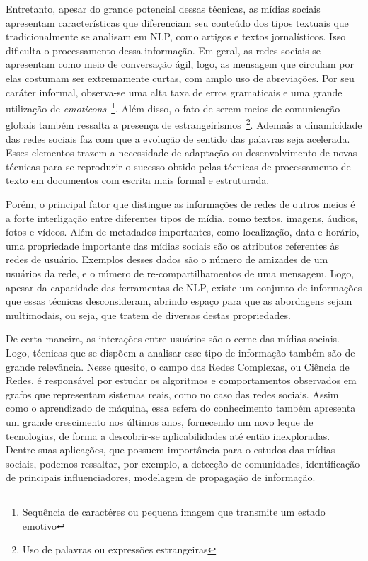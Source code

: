 Entretanto, apesar do grande potencial dessas técnicas, as mídias sociais
apresentam características que diferenciam seu conteúdo dos tipos textuais que
tradicionalmente se analisam em NLP, como artigos e textos jornalísticos.
Isso dificulta o processamento dessa informação.
Em geral, as redes sociais se apresentam como meio de conversação ágil, logo,
as mensagem que circulam por elas costumam ser extremamente curtas, com amplo
uso de abreviações.
Por seu caráter informal, observa-se uma alta taxa de erros gramaticais e
uma grande utilização de \textit{emoticons}~\footnote{Sequência de caractéres ou
pequena imagem que transmite um estado emotivo}.
Além disso, o fato de serem meios de comunicação globais também ressalta a presença
de estrangeirismos~\footnote{Uso de palavras ou expressões estrangeiras}.
Ademais a dinamicidade das redes sociais faz com que a evolução de sentido das
palavras seja acelerada.
Esses elementos trazem a necessidade de adaptação ou desenvolvimento de novas
técnicas para se reproduzir o sucesso obtido pelas técnicas de processamento de
texto em documentos com escrita mais formal e estruturada.

Porém, o principal fator que distingue as informações de redes de outros meios é
a forte interligação entre diferentes tipos de mídia, como textos, imagens,
áudios, fotos e vídeos.
Além de metadados importantes, como localização, data e horário, uma propriedade
importante das mídias sociais são os atributos referentes às redes de usuário.
Exemplos desses dados são o número de amizades de um usuários da rede, e o
número de re-compartilhamentos de uma mensagem.
Logo, apesar da capacidade das ferramentas de NLP, existe um conjunto de
informações que essas técnicas desconsideram, abrindo espaço para que as
abordagens sejam multimodais, ou seja, que tratem de diversas destas
propriedades.

De certa maneira, as interações entre usuários são o cerne das mídias sociais.
Logo, técnicas que se dispõem a analisar esse tipo de informação também são de
grande relevância.
Nesse quesito, o campo das Redes Complexas, ou Ciência de Redes, é responsável
por estudar os algoritmos e comportamentos observados em grafos que representam
sistemas reais, como no caso das redes sociais.
Assim como o aprendizado de máquina, essa esfera do conhecimento também
apresenta um grande crescimento nos últimos anos, fornecendo um novo leque de
tecnologias, de forma a descobrir-se aplicabilidades até então inexploradas.
Dentre suas aplicações, que possuem importância para o estudos das mídias
sociais, podemos ressaltar, por exemplo, a detecção de comunidades, identificação de
principais influenciadores, modelagem de propagação de informação.

